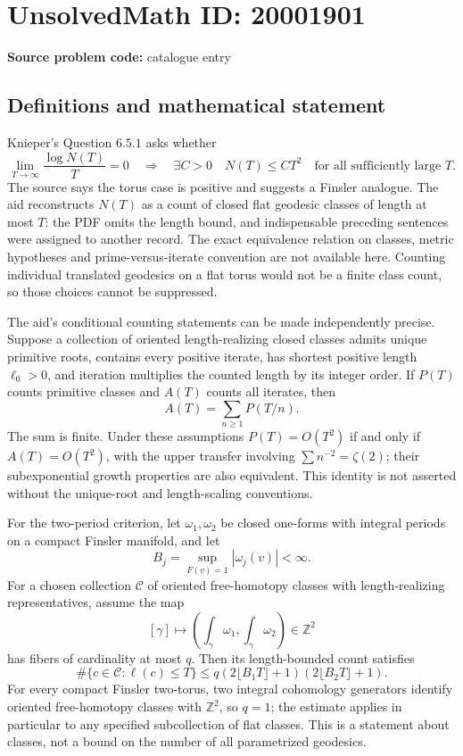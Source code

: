\documentclass[11pt]{article}
\newcommand{\Z}{\mathbb{Z}}
\begin{document}
\section*{UnsolvedMath ID: 20001901}
\textbf{Source problem code:} catalogue entry
\subsection{Definitions and mathematical statement}
Knieper's Question \(6.5.1\) asks whether
\[
 \lim_{T\to\infty}\frac{\log N(T)}T=0
 \quad\Longrightarrow\quad
 \exists C>0\quad N(T)\leq CT^2\quad\text{for all sufficiently large }T.
\]
The source says the torus case is positive and suggests a Finsler analogue. The aid reconstructs \(N(T)\) as a count of closed flat geodesic classes of length at most \(T\): the PDF omits the length bound, and indispensable preceding sentences were assigned to another record. The exact equivalence relation on classes, metric hypotheses and prime-versus-iterate convention are not available here. Counting individual translated geodesics on a flat torus would not be a finite class count, so those choices cannot be suppressed.

The aid's conditional counting statements can be made independently precise. Suppose a collection of oriented length-realizing closed classes admits unique primitive roots, contains every positive iterate, has shortest positive length \(\ell_0>0\), and iteration multiplies the counted length by its integer order. If \(P(T)\) counts primitive classes and \(A(T)\) counts all iterates, then
\[
 A(T)=\sum_{n\geq1}P(T/n).
\]
The sum is finite. Under these assumptions \(P(T)=O(T^2)\) if and only if \(A(T)=O(T^2)\), with the upper transfer involving \(\sum n^{-2}=\zeta(2)\); their subexponential growth properties are also equivalent. This identity is not asserted without the unique-root and length-scaling conventions.

For the two-period criterion, let \(\omega_1,\omega_2\) be closed one-forms with integral periods on a compact Finsler manifold, and let
\[
 B_j=\sup_{F(v)=1}|\omega_j(v)|<\infty.
\]
For a chosen collection \(\mathcal C\) of oriented free-homotopy classes with length-realizing representatives, assume the map
\[
 [\gamma]\longmapsto\left(\int_\gamma\omega_1,\int_\gamma\omega_2\right)\in\Z^2
\]
has fibers of cardinality at most \(q\). Then its length-bounded count satisfies
\[
 \#\{c\in\mathcal C:\ell(c)\leq T\}
 \leq q(2\lfloor B_1T\rfloor+1)(2\lfloor B_2T\rfloor+1).
\]
For every compact Finsler two-torus, two integral cohomology generators identify oriented free-homotopy classes with \(\Z^2\), so \(q=1\); the estimate applies in particular to any specified subcollection of flat classes. This is a statement about classes, not a bound on the number of all parametrized geodesics.
\end{document}
